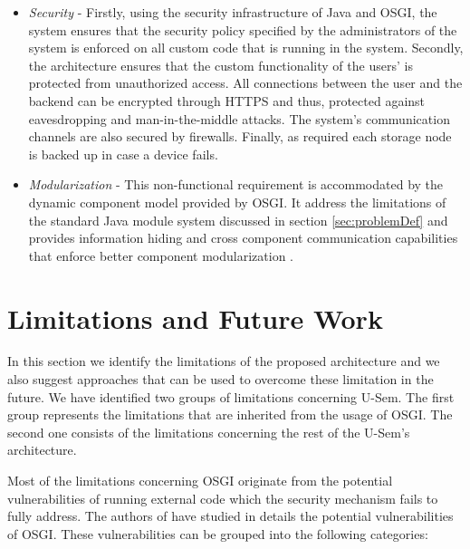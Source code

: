 \begin{itemize}
\item \textit{Security} - Firstly, using the security infrastructure of Java and OSGI, the system ensures that the security policy specified by the administrators of the system is enforced on all custom code that is running in the system. Secondly, the architecture ensures that the custom functionality of the users' is protected from unauthorized access. All connections between the user and the backend can be encrypted through HTTPS and thus, protected against eavesdropping and man-in-the-middle attacks. The system's communication channels are also secured by firewalls. Finally, as required each storage node is backed up in case a device fails.

\item \textit{Modularization} - This non-functional requirement is accommodated by the dynamic component model provided by OSGI. It address the limitations of the standard Java module system discussed in section \ref{sec:problemDef} and provides information hiding and cross component communication capabilities that enforce better component modularization \cite{Andre}.

\end{itemize}


\section{Limitations and Future Work}
\label{sec:limits}

In this section we identify the limitations of the proposed architecture and we also suggest approaches that can be used to overcome these limitation in the future. We have identified two groups of limitations concerning U-Sem. The first group represents the limitations that are inherited from the usage of OSGI. The second one consists of the limitations concerning the rest of the U-Sem's architecture.

Most of the limitations concerning OSGI originate from the potential vulnerabilities of running external code which the security mechanism fails to fully address. The authors of \cite{Parrend} have studied in details the potential vulnerabilities of OSGI. These vulnerabilities can be grouped into the following categories:

